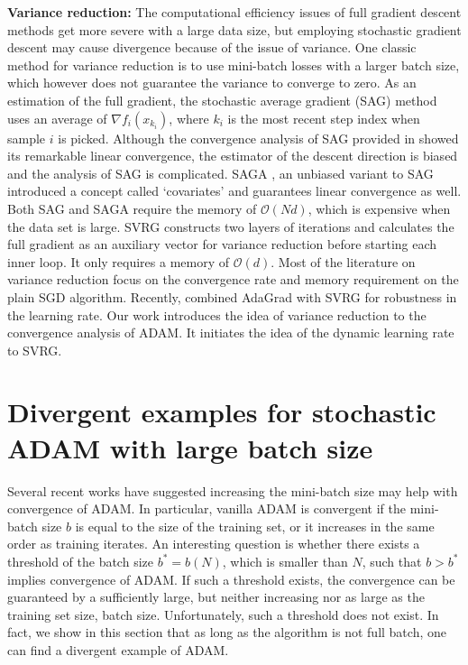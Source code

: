\documentclass[twoside]{article}
\def\OO{\mathcal{O}}
\begin{document}
\textbf{Variance reduction:} The computational efficiency issues of full gradient descent methods get more severe with a large data size, but employing stochastic gradient descent may cause divergence because of the issue of variance. One classic method for variance reduction is to use mini-batch losses with a larger batch size, which however does not guarantee the variance to converge to zero. As an estimation of the full gradient, the stochastic average gradient (SAG) method \cite{le2013stochastic} uses an average of $\nabla f_i(x_{k_i})$, where $k_i$ is the most recent step index when sample $i$ is picked. Although the convergence analysis of SAG provided in \cite{schmidt2017minimizing} showed its remarkable linear convergence, the estimator of the descent direction is biased and the analysis of SAG is complicated. SAGA \cite{defazio2014saga}, an unbiased variant to SAG introduced a concept called `covariates' and guarantees linear convergence as well. Both SAG and SAGA require the memory of $\OO(Nd)$, which is expensive when the data set is large. SVRG \cite{johnson2013accelerating} constructs two layers of iterations and calculates the full gradient as an auxiliary vector for variance reduction before starting each inner loop. It only requires a memory of $\OO(d)$. Most of the literature on variance reduction focus on the convergence rate and memory requirement on the plain SGD algorithm. Recently, \cite{dubois2021svrg} combined AdaGrad with SVRG for robustness in the learning rate. Our work introduces the idea of variance reduction to the convergence analysis of ADAM. It initiates the idea of the dynamic learning rate to SVRG.

\section{Divergent examples for stochastic ADAM with large batch size}
\label{sec:divergent}
Several recent works \cite{shi2020rmsprop, zaheer2018adaptive, de2018convergence} have suggested increasing the mini-batch size may help with convergence of ADAM. In particular, vanilla ADAM is convergent if the mini-batch size $b$ is equal to the size of the training set, or it increases in the same order as training iterates. An interesting question is whether there exists a threshold of the batch size $b^*=b(N)$, which is smaller than $N$, such that $b>b^*$ implies convergence of ADAM. If such a threshold exists, the convergence can be guaranteed by a sufficiently large, but neither increasing nor as large as the training set size, batch size. Unfortunately, such a threshold does not exist. In fact, we show in this section that as long as the algorithm is not full batch, one can find a divergent example of ADAM.
\end{document}
